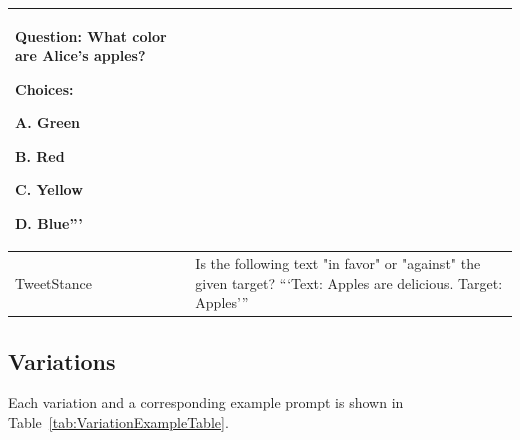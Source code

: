 \documentclass[11pt, dvipsnames]{article}
\begin{document}
\begin{table}
\begin{tabular}{|p{1.2in}|p{5in}|}
\vspace{1em}
Question: What color are Alice's apples?

\vspace{1em}
Choices:

A. Green

B. Red

C. Yellow

D. Blue''' \\
		\hline
		TweetStance & Is the following text "in favor" or "against" the given target? ```Text: Apples are delicious. Target: Apples''' \\
		\hline
	\end{tabular}
	\label{tab:TaskExamplesTable}
\end{table}

\subsection{Variations}
Each variation and a corresponding example prompt is shown in Table~\ref{tab:VariationExampleTable}.

\onecolumn
\end{document}
